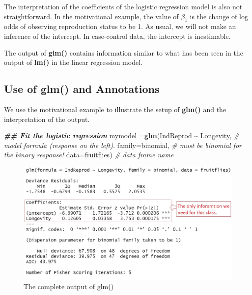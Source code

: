 \documentclass[
]{book}
\newenvironment{Shaded}{\begin{snugshade}}{\end{snugshade}}
\newcommand{\AttributeTok}[1]{\textcolor[rgb]{0.13,0.29,0.53}{#1}}
\newcommand{\CommentTok}[1]{\textcolor[rgb]{0.56,0.35,0.01}{\textit{#1}}}
\newcommand{\DocumentationTok}[1]{\textcolor[rgb]{0.56,0.35,0.01}{\textbf{\textit{#1}}}}
\newcommand{\FunctionTok}[1]{\textcolor[rgb]{0.13,0.29,0.53}{\textbf{#1}}}
\newcommand{\NormalTok}[1]{#1}
\newcommand{\OtherTok}[1]{\textcolor[rgb]{0.56,0.35,0.01}{#1}}
\newcommand{\SpecialCharTok}[1]{\textcolor[rgb]{0.81,0.36,0.00}{\textbf{#1}}}
\begin{document}
The interpretation of the coefficients of the logistic regression model is also not straightforward. In the motivational example, the value of \(\beta_1\) is the change of log odds of observing reproduction status to be 1. As usual, we will not make an inference of the intercept. In case-control data, the intercept is inestimable.

The output of \textbf{glm()} contains information similar to what has been seen in the output of \textbf{lm()} in the linear regression model.

\hypertarget{use-of-glm-and-annotations}{%
\subsection{\texorpdfstring{Use of \textbf{glm()} and Annotations}{Use of glm() and Annotations}}\label{use-of-glm-and-annotations}}

We use the motivational example to illustrate the setup of \textbf{glm()} and the interpretation of the output.

\begin{Shaded}
\begin{Highlighting}[]
\DocumentationTok{\#\# Fit the logistic regression}
\NormalTok{mymodel }\OtherTok{=}\FunctionTok{glm}\NormalTok{(IndReprod }\SpecialCharTok{\textasciitilde{}}\NormalTok{ Longevity,   }\CommentTok{\# model formula (response on the left).}
          \AttributeTok{family=}\NormalTok{binomial,            }\CommentTok{\# must be binomial for the binary response!}
          \AttributeTok{data=}\NormalTok{fruitflies)            }\CommentTok{\# data frame name}
\end{Highlighting}
\end{Shaded}

\begin{figure}

{\centering \includegraphics[width=0.8\linewidth]{img11/w11-glm-output} 

}

\caption{The complete output of glm()}\label{fig:unnamed-chunk-175}
\end{figure}
\end{document}
